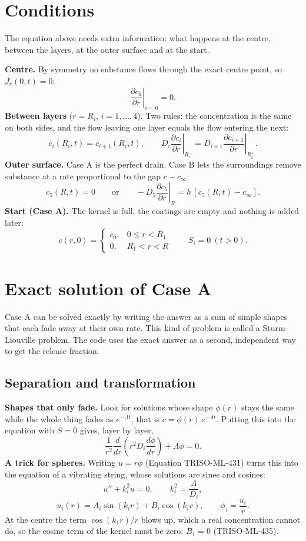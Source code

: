 \documentclass[11pt]{article}
\begin{document}
\section{Conditions}
The equation above needs extra information: what happens at the centre, between the layers, at the outer surface and at the start.

\textbf{Centre.} By symmetry no substance flows through the exact centre point, so $J_r(0,t)=0$:
\[
\left.\frac{\partial c_1}{\partial r}\right|_{r=0}=0 .
\]
\textbf{Between layers} ($r=R_i$, $i=1,\dots,4$). Two rules: the concentration is the same on both sides, and the flow leaving one layer equals the flow entering the next:
\[
c_i(R_i,t)=c_{i+1}(R_i,t),\qquad D_i\left.\frac{\partial c_i}{\partial r}\right|_{R_i^-}=D_{i+1}\left.\frac{\partial c_{i+1}}{\partial r}\right|_{R_i^+}.
\]
\textbf{Outer surface.} Case A is the perfect drain. Case B lets the surroundings remove substance at a rate proportional to the gap $c-c_\infty$:
\[
c_5(R,t)=0\qquad\text{or}\qquad -D_5\left.\frac{\partial c_5}{\partial r}\right|_R=h\,[c_5(R,t)-c_\infty].
\]
\textbf{Start (Case A).} The kernel is full, the coatings are empty and nothing is added later:
\[
c(r,0)=\begin{cases}c_0,&0\le r<R_1\\0,&R_1<r<R\end{cases}\qquad S_i=0\ (t>0).
\]

\section{Exact solution of Case A}\label{sec:exact}
Case A can be solved exactly by writing the answer as a sum of simple shapes that each fade away at their own rate. This kind of problem is called a Sturm-Liouville problem. The code uses the exact answer as a second, independent way to get the release fraction.

\subsection{Separation and transformation}
\textbf{Shapes that only fade.} Look for solutions whose shape $\phi(r)$ stays the same while the whole thing fades as $e^{-\Lambda t}$, that is $c=\phi(r)\,e^{-\Lambda t}$. Putting this into the equation with $S=0$ gives, layer by layer,
\[
\frac{1}{r^2}\frac{d}{dr}\left(r^2D_i\frac{d\phi}{dr}\right)+\Lambda\phi=0 .
\]
\textbf{A trick for spheres.} Writing $u=r\phi$ (Equation TRISO-ML-431) turns this into the equation of a vibrating string, whose solutions are sines and cosines:
\begin{equation}
u''+k_i^2u=0,\qquad k_i^2=\frac{\Lambda}{D_i},
\tag{TRISO-ML-432}
\end{equation}
\begin{equation}
u_i(r)=A_i\sin(k_ir)+B_i\cos(k_ir),\qquad \phi_i=\frac{u_i}{r}.
\tag{TRISO-ML-433}
\end{equation}
At the centre the term $\cos(k_1r)/r$ blows up, which a real concentration cannot do, so the cosine term of the kernel must be zero: $B_1=0$ (TRISO-ML-435).
\end{document}
